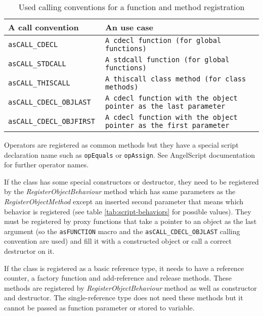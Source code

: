 \begin{table}[htbp]
	\centering
		{\scriptsize
		\begin{tabular}{|p{0.24\hsize}|p{0.69\hsize}|}
		\hline
		A call convention & An use case\\
		\hline
		\verb/asCALL_CDECL/ & \verb/A cdecl function (for global functions)/\\
		\verb/asCALL_STDCALL/ & \verb/A stdcall function (for global functions)/\\
		\verb/asCALL_THISCALL / & \verb/A thiscall class method (for class methods)/\\
		\verb/asCALL_CDECL_OBJLAST / & \verb/A cdecl function with the object pointer as the last parameter/\\
		\verb/asCALL_CDECL_OBJFIRST / & \verb/A cdecl function with the object pointer as the first parameter/\\
		\hline
		\end{tabular}
		}
	\caption{Used calling conventions for a function and method registration}
	\label{tab:script-conventions}
\end{table}

Operators are registered as common methods but they have a special script declaration name such as \verb/opEquals/ or \verb/opAssign/. See AngelScript documentation \cite{angelscript} for further operator names.

If the class has some special constructors or destructor, they need to be registered by the \emph{RegisterObjectBehaviour} method which has same parameters as the \emph{RegisterObjectMethod} except an inserted second parameter that means which behavior is registered (see table \ref{tab:script-behaviors} for possible values). They must be registered by proxy functions that take a pointer to an object as the last argument (so the \verb/asFUNCTION/ macro and the \verb/asCALL_CDECL_OBJLAST/ calling convention are used) and fill it with a constructed object or call a correct destructor on it.

If the class is registered as a basic reference type, it needs to have a reference counter, a factory function and add-reference and release methods. These methods are registered by \emph{RegisterObjectBehaviour} method as well as constructor and destructor. The single-reference type does not need these methods but it cannot be passed as function parameter or stored to variable.

